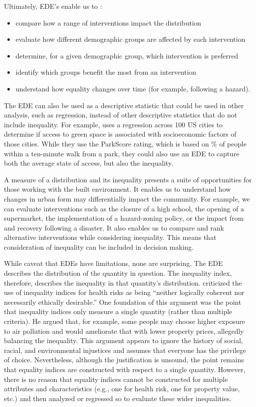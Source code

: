 \documentclass[final,3p,times,onecolumn,sort&compress]{elsarticle}
\begin{document}
Ultimately, EDE's enable us to \citep{Sheriff2020-ge}: 
\begin{itemize}
    \item compare how a range of interventions impact the distribution
    \item evaluate how different demographic groups are affected by each intervention
    \item determine, for a given demographic group, which intervention is preferred
    \item identify which groups benefit the most from an intervention
    \item understand how equality changes over time (for example, following a hazard).
\end{itemize}
The EDE can also be used as a descriptive statistic that could be used in other analysis, such as regression, instead of other descriptive statistics that do not include inequality.
For example, \cite{Rigolon2018-jl} uses a regression across 100 US cities to determine if access to green space is associated with socioeconomic factors of those cities.
While they use the ParkScore rating, which is based on \% of people within a ten-minute walk from a park, they could also use an EDE to capture both the average state of access, but also the inequality.

A measure of a distribution and its inequality presents a suite of opportunities for those working with the built environment.
It enables us to understand how changes in urban form may differentially impact the community.
For example, we can evaluate interventions such as the closure of a high school, the opening of a supermarket, the implementation of a hazard-zoning policy, or the impact from and recovery following a disaster.
It also enables us to compare and rank alternative interventions while considering inequality.
This means that consideration of inequality can be included in decision making.

While \cite{Sheriff2020-ge} caveat that EDEs have limitations, none are surprising.
The EDE describes the distribution of the quantity in question.
The inequality index, therefore, describes the inequality in that quantity's distribution.
\cite{Cox2012-lg} criticized the use of inequality indices for health risks as being ``neither logically coherent nor necessarily ethically desirable.''
One foundation of this argument was the point that inequality indices only measure a single quantity (rather than multiple criteria). 
He argued that, for example, some people may choose higher exposure to air pollution and would ameliorate that with lower property prices, allegedly balancing the inequality. 
This argument appears to ignore the history of social, racial, and environmental injustices and assumes that everyone has the privilege of choice.
Nevertheless, although the justification is unsound, the point remains that equality indices are constructed with respect to a single quantity.
However, there is no reason that equality indices cannot be constructed for multiple attributes and characteristics (e.g., one for health risk, one for property value, etc.) and then analyzed or regressed so to evaluate these wider inequalities.
\end{document}
